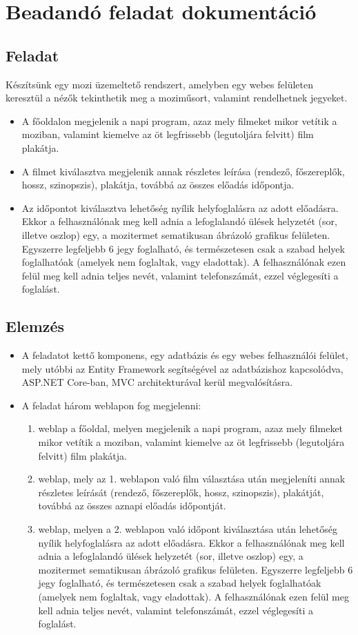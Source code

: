 \documentclass{article}
\begin{document}
	\section*{Beadandó feladat dokumentáció}
	\subsection*{Feladat}
	Készítsünk egy mozi üzemeltető rendszert, amelyben egy webes felületen keresztül a nézők tekinthetik meg a moziműsort, valamint rendelhetnek jegyeket.
	\begin{itemize}
		\item A főoldalon megjelenik a napi program, azaz mely filmeket mikor vetítik a moziban, valamint kiemelve az öt legfrissebb (legutoljára felvitt) film plakátja.
		\item A filmet kiválasztva megjelenik annak részletes leírása (rendező, főszereplők, hossz, szinopszis), plakátja, továbbá az összes előadás időpontja.
		\item Az időpontot kiválasztva lehetőség nyílik helyfoglalásra az adott előadásra. Ekkor a felhasználónak meg kell adnia a lefoglalandó ülések helyzetét (sor, illetve oszlop) egy, a mozitermet sematikusan ábrázoló grafikus felületen. Egyszerre legfeljebb 6 jegy foglalható, és természetesen csak a szabad helyek foglalhatóak (amelyek nem foglaltak, vagy eladottak). A felhasználónak ezen felül meg kell adnia teljes nevét, valamint telefonszámát, ezzel véglegesíti a foglalást.
	\end{itemize}
	\subsection*{Elemzés}
	\begin{itemize}
		\item A feladatot kettő komponens, egy adatbázis és egy webes felhasználói felület, mely utóbbi az Entity Framework segítségével az adatbázishoz kapcsolódva, ASP.NET Core-ban, MVC architekturával kerül megvalósításra.
		\item A feladat három weblapon fog megjelenni:
		\begin{enumerate}
			\item weblap a főoldal, melyen megjelenik a napi program, azaz mely filmeket mikor vetítik a moziban, valamint kiemelve az öt legfrissebb (legutoljára felvitt) film plakátja.
			\item weblap, mely az 1. weblapon való film választása után megjeleníti annak részletes leírását (rendező, főszereplők, hossz, szinopszis), plakátját, továbbá az összes aznapi előadás időpontját.
			\item weblap, melyen a 2. weblapon való időpont kiválasztása után lehetőség nyílik helyfoglalásra az adott előadásra. Ekkor a felhasználónak meg kell adnia a lefoglalandó ülések helyzetét (sor, illetve oszlop) egy, a mozitermet sematikusan ábrázoló grafikus felületen. Egyszerre legfeljebb 6 jegy foglalható, és természetesen csak a szabad helyek foglalhatóak (amelyek nem foglaltak, vagy eladottak). A felhasználónak ezen felül meg kell adnia teljes nevét, valamint telefonszámát, ezzel véglegesíti a foglalást.
		\end{enumerate}
	\end{itemize}
\end{document}
